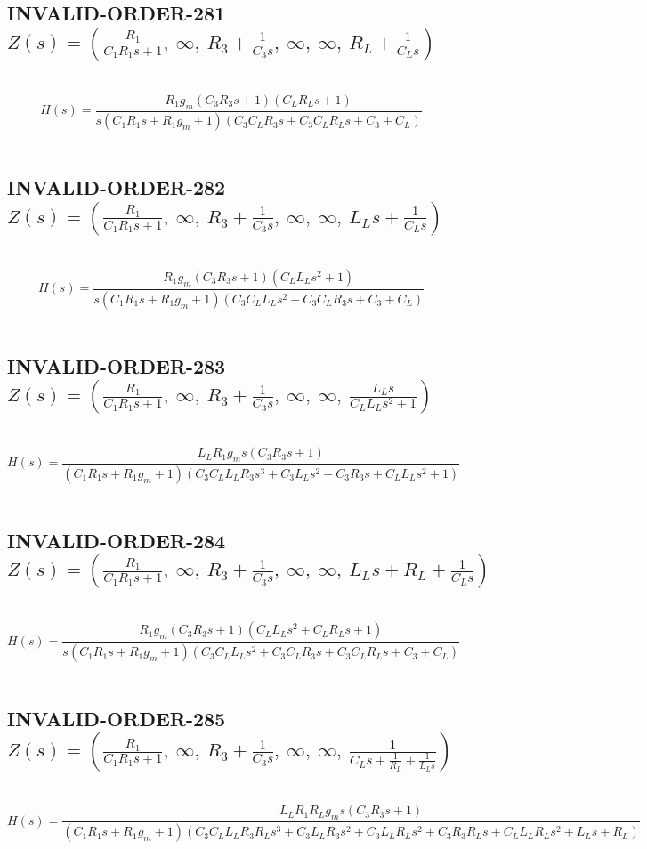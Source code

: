 \documentclass{article}
\begin{document}
\subsection{INVALID-ORDER-281 $Z(s) = \left( \frac{R_{1}}{C_{1} R_{1} s + 1}, \  \infty, \  R_{3} + \frac{1}{C_{3} s}, \  \infty, \  \infty, \  R_{L} + \frac{1}{C_{L} s}\right)$ } \ 
\textbf{\[H(s) = \frac{R_{1} g_{m} \left(C_{3} R_{3} s + 1\right) \left(C_{L} R_{L} s + 1\right)}{s \left(C_{1} R_{1} s + R_{1} g_{m} + 1\right) \left(C_{3} C_{L} R_{3} s + C_{3} C_{L} R_{L} s + C_{3} + C_{L}\right)}\] } \ 
\subsection{INVALID-ORDER-282 $Z(s) = \left( \frac{R_{1}}{C_{1} R_{1} s + 1}, \  \infty, \  R_{3} + \frac{1}{C_{3} s}, \  \infty, \  \infty, \  L_{L} s + \frac{1}{C_{L} s}\right)$ } \ 
\textbf{\[H(s) = \frac{R_{1} g_{m} \left(C_{3} R_{3} s + 1\right) \left(C_{L} L_{L} s^{2} + 1\right)}{s \left(C_{1} R_{1} s + R_{1} g_{m} + 1\right) \left(C_{3} C_{L} L_{L} s^{2} + C_{3} C_{L} R_{3} s + C_{3} + C_{L}\right)}\] } \ 
\subsection{INVALID-ORDER-283 $Z(s) = \left( \frac{R_{1}}{C_{1} R_{1} s + 1}, \  \infty, \  R_{3} + \frac{1}{C_{3} s}, \  \infty, \  \infty, \  \frac{L_{L} s}{C_{L} L_{L} s^{2} + 1}\right)$ } \ 
\textbf{\[H(s) = \frac{L_{L} R_{1} g_{m} s \left(C_{3} R_{3} s + 1\right)}{\left(C_{1} R_{1} s + R_{1} g_{m} + 1\right) \left(C_{3} C_{L} L_{L} R_{3} s^{3} + C_{3} L_{L} s^{2} + C_{3} R_{3} s + C_{L} L_{L} s^{2} + 1\right)}\] } \ 
\subsection{INVALID-ORDER-284 $Z(s) = \left( \frac{R_{1}}{C_{1} R_{1} s + 1}, \  \infty, \  R_{3} + \frac{1}{C_{3} s}, \  \infty, \  \infty, \  L_{L} s + R_{L} + \frac{1}{C_{L} s}\right)$ } \ 
\textbf{\[H(s) = \frac{R_{1} g_{m} \left(C_{3} R_{3} s + 1\right) \left(C_{L} L_{L} s^{2} + C_{L} R_{L} s + 1\right)}{s \left(C_{1} R_{1} s + R_{1} g_{m} + 1\right) \left(C_{3} C_{L} L_{L} s^{2} + C_{3} C_{L} R_{3} s + C_{3} C_{L} R_{L} s + C_{3} + C_{L}\right)}\] } \ 
\subsection{INVALID-ORDER-285 $Z(s) = \left( \frac{R_{1}}{C_{1} R_{1} s + 1}, \  \infty, \  R_{3} + \frac{1}{C_{3} s}, \  \infty, \  \infty, \  \frac{1}{C_{L} s + \frac{1}{R_{L}} + \frac{1}{L_{L} s}}\right)$ } \ 
\textbf{\[H(s) = \frac{L_{L} R_{1} R_{L} g_{m} s \left(C_{3} R_{3} s + 1\right)}{\left(C_{1} R_{1} s + R_{1} g_{m} + 1\right) \left(C_{3} C_{L} L_{L} R_{3} R_{L} s^{3} + C_{3} L_{L} R_{3} s^{2} + C_{3} L_{L} R_{L} s^{2} + C_{3} R_{3} R_{L} s + C_{L} L_{L} R_{L} s^{2} + L_{L} s + R_{L}\right)}\] } \ 
\end{document}
